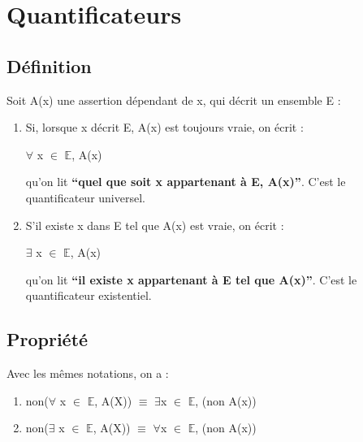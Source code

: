 \documentclass{article}
\begin{document}
	\section{Quantificateurs}
	
	\subsection{Définition}
	
	Soit A(x) une assertion dépendant de x, qui décrit un ensemble E :
	
	\begin{enumerate}
		
		\item {Si, lorsque x décrit E, A(x) est toujours vraie, on écrit : \newline
			
			\begin{center}
				
				$\forall$ x $\in$ $\mathbb{E}$, A(x)  \newline
				
			\end{center}
			
			qu’on lit \textbf{“quel que soit x appartenant à E, A(x)”}. C’est le quantificateur universel.
			
		}
		
		\item {S’il existe x dans E tel que A(x) est vraie, on écrit : \\
			
			\begin{center}
				
				$\exists$ x $\in$ $\mathbb{E}$, A(x)  \newline
				
			\end{center}
			
			qu’on lit\textbf{ “il existe x appartenant à E tel que A(x)”}. C’est le quantificateur existentiel.}
		
	\end{enumerate}
	
	\subsection{Propriété}
	
	Avec les mêmes notations, on a :
	
	
	\begin{enumerate}
		
		\item {non($\forall$ x $\in$ $\mathbb{E}$, A(X)) $\equiv$ $\exists$x $\in$ $\mathbb{E}$, (non A(x))}
		
		\item {non($\exists$ x $\in$ $\mathbb{E}$, A(X)) $\equiv$ $\forall$x $\in$ $\mathbb{E}$, (non A(x))}
		
	\end{enumerate}
	
\end{document}
